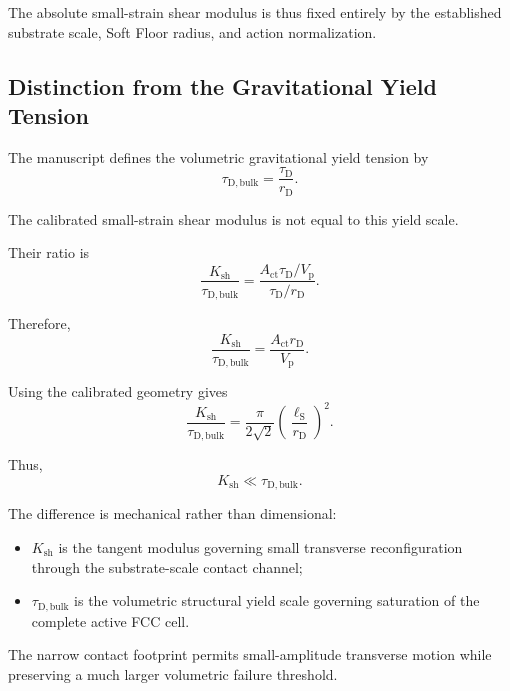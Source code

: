 The absolute small-strain shear modulus is thus fixed entirely by the established substrate scale, Soft Floor radius, and action normalization.

\subsection{Distinction from the Gravitational Yield Tension}

The manuscript defines the volumetric gravitational yield tension by
\begin{equation}
    \tau_{\mathrm{D,bulk}} = \frac{\tau_{\mathrm{D}}}{r_{\mathrm{D}}}.
\end{equation}

The calibrated small-strain shear modulus is not equal to this yield scale.

Their ratio is
\begin{equation}
    \frac{K_{\mathrm{sh}}}{\tau_{\mathrm{D,bulk}}} = \frac{ A_{\mathrm{ct}}\tau_{\mathrm{D}}/V_{\mathrm{p}} }{ \tau_{\mathrm{D}}/r_{\mathrm{D}} }.
\end{equation}

Therefore,
\begin{equation}
    \frac{K_{\mathrm{sh}}}{\tau_{\mathrm{D,bulk}}} = \frac{ A_{\mathrm{ct}}r_{\mathrm{D}} }{ V_{\mathrm{p}} }.
\end{equation}

Using the calibrated geometry gives
\begin{equation}
    \boxed{ \frac{K_{\mathrm{sh}}}{\tau_{\mathrm{D,bulk}}} = \frac{\pi}{2\sqrt{2}} \left( \frac{\ell_{\mathrm{S}}}{r_{\mathrm{D}}} \right)^2 }.
\end{equation}

Thus,
\begin{equation}
    \boxed{ K_{\mathrm{sh}} \ll \tau_{\mathrm{D,bulk}} }.
\end{equation}

The difference is mechanical rather than dimensional:
\begin{itemize}
    \item $K_{\mathrm{sh}}$ is the tangent modulus governing small transverse reconfiguration through the substrate-scale contact channel;
    \item $\tau_{\mathrm{D,bulk}}$ is the volumetric structural yield scale governing saturation of the complete active FCC cell.
\end{itemize}

The narrow contact footprint permits small-amplitude transverse motion while preserving a much larger volumetric failure threshold.

